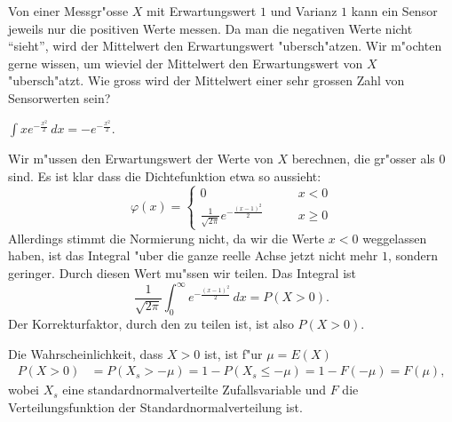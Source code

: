 Von einer Messgr"osse $X$ mit Erwartungswert $1$ und Varianz $1$
kann ein Sensor jeweils nur die positiven Werte messen.
Da man die negativen Werte nicht ``sieht'', wird der Mittelwert 
den Erwartungswert "ubersch"atzen.
Wir m"ochten gerne wissen, um wieviel der Mittelwert den Erwartungswert
von $X$ "ubersch"atzt.
Wie gross wird der Mittelwert einer sehr grossen Zahl von Sensorwerten sein?

\begin{hinweis}
$\int xe^{-\frac{x^2}2}\,dx = -e^{-\frac{x^2}2}.$
\end{hinweis}

\begin{loesung}
Wir m"ussen den Erwartungswert der Werte von $X$ berechnen, die gr"osser
als $0$ sind. Es ist klar dass die Dichtefunktion etwa so aussieht:
\[
\varphi(x)=\begin{cases}
0&\qquad x<0\\
\frac1{\sqrt{2\pi}}e^{-\frac{(x-1)^2}2}&\qquad x\ge 0
\end{cases}
\]
Allerdings stimmt die Normierung nicht, da wir die Werte $x < 0$ weggelassen
haben, ist das Integral "uber die ganze reelle Achse jetzt nicht mehr $1$,
sondern geringer. Durch diesen Wert mu"ssen wir teilen. Das Integral ist
\[
\frac1{\sqrt{2\pi}}
\int_{0}^\infty
e^{-\frac{(x-1)^2}2}\,dx=
P(X > 0).
\]
Der Korrekturfaktor, durch den zu teilen ist, ist also $P(X>0)$.

Die Wahrscheinlichkeit, dass $X>0$ ist, ist f"ur $\mu=E(X)$
\begin{align*}
P(X>0)&=P(X_s > -\mu)=1-P(X_s\le-\mu)=1-F(-\mu)=F(\mu),
\end{align*}
wobei $X_s$ eine standardnormalverteilte Zufallsvariable und $F$ die
Verteilungsfunktion der Standardnormalverteilung ist.


\end{loesung}
